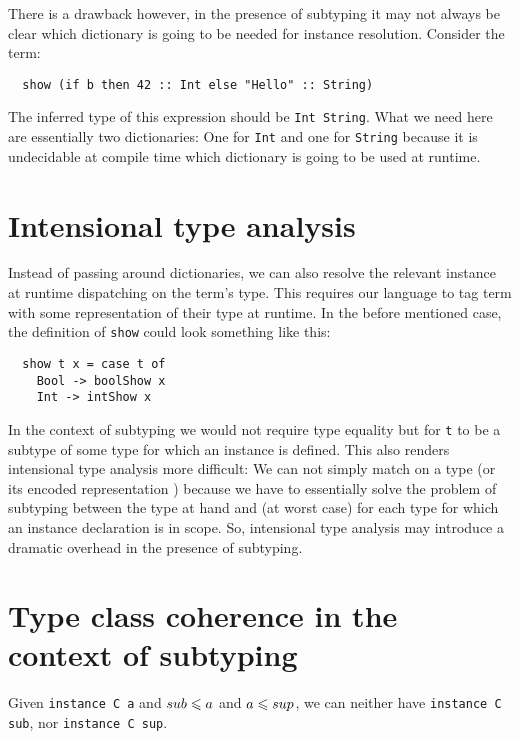 \cite{kiselyov}

There is a drawback however, in the presence of subtyping it may not always be clear which dictionary is going to be needed for instance resolution.
Consider the term:

\begin{verbatim}
  show (if b then 42 :: Int else "Hello" :: String)
\end{verbatim}

The inferred type of this expression should be \texttt{Int \/ String}.
What we need here are essentially two dictionaries: One for \texttt{Int} and one for \texttt{String} because it is undecidable at compile time which dictionary is going to be used at runtime.

\section{Intensional type analysis}

Instead of passing around dictionaries, we can also resolve the relevant instance at runtime dispatching on the term's type.
This requires our language to tag term with some representation of their type at runtime.
In the before mentioned case, the definition of \texttt{show} could look something like this:

\begin{verbatim}
  show t x = case t of
    Bool -> boolShow x
    Int -> intShow x
\end{verbatim}

In the context of subtyping we would not require type equality but for \texttt{t} to be a subtype of some type for which an instance is defined.
This also renders intensional type analysis more difficult:
We can not simply match on a type (or its encoded representation \cite{weirich2000}) because we have to essentially solve the problem of subtyping between the type at hand and (at worst case) for each type for which an instance declaration is in scope.
So, intensional type analysis may introduce a dramatic overhead in the presence of subtyping.

\section{Type class coherence in the context of subtyping}
  Given \texttt{instance C a} and $sub \leqslant a$ and $a \leqslant sup$, we can neither have \texttt{instance C sub}, nor \texttt{instance C sup}.

